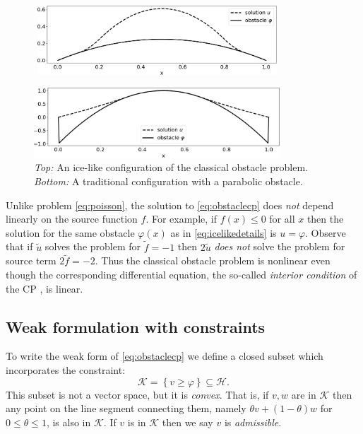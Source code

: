 \documentclass[letterpaper,final,12pt,reqno]{amsart}
\theoremstyle{claim}
\numberwithin{equation}{section}
\numberwithin{figure}{section}
\numberwithin{table}{section}
\numberwithin{theorem}{section}
\begin{document}
\begin{figure}
\,\,\includegraphics[width=0.8\textwidth]{fixfigs/icelike.pdf}

\bigskip\medskip
\includegraphics[width=0.82\textwidth]{fixfigs/parabola.pdf}

\medskip
\caption{\emph{Top:} An ice-like configuration of the classical obstacle problem. \emph{Bottom:} A traditional configuration with a parabolic obstacle.}
\label{fig:icelike}
\end{figure}

Unlike problem \eqref{eq:poisson}, the solution to \eqref{eq:obstaclecp} does \emph{not} depend linearly on the source function $f$.  For example, if $f(x)\le 0$ for all $x$ then the solution for the same obstacle $\varphi(x)$ as in \eqref{eq:icelikedetails} is $u=\varphi$.  Observe that if $\tilde u$ solves the problem for $\tilde f= -1$ then $2\tilde u$ \emph{does not} solve the problem for source term $2\tilde f = -2$.  Thus the classical obstacle problem is nonlinear even though the corresponding differential equation, the so-called \emph{interior condition} of the CP \cite{KinderlehrerStampacchia1980}, is linear.

\subsection*{Weak formulation with constraints}  To write the weak form of \eqref{eq:obstaclecp} we define a closed subset which incorporates the constraint:
\begin{equation}
\mathcal{K} = \left\{v \ge \varphi\right\} \subseteq \mathcal{H}.  \label{eq:Kdefine}
\end{equation}
This subset is not a vector space, but it is \emph{convex}.  That is, if $v,w$ are in $\mathcal{K}$ then any point on the line segment connecting them, namely $\theta v + (1-\theta) w$ for $0 \le \theta \le 1$, is also in $\mathcal{K}$.  If $v$ is in $\mathcal{K}$ then we say $v$ is \emph{admissible}.
\end{document}
